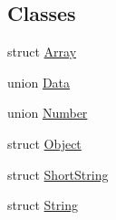 \subsection*{Classes}
\begin{DoxyCompactItemize}
\item 
struct \hyperlink{structGenericValue_1_1Array}{Array}
\item 
union \hyperlink{unionGenericValue_1_1Data}{Data}
\item 
union \hyperlink{unionGenericValue_1_1Number}{Number}
\item 
struct \hyperlink{structGenericValue_1_1Object}{Object}
\item 
struct \hyperlink{structGenericValue_1_1ShortString}{Short\+String}
\item 
struct \hyperlink{structGenericValue_1_1String}{String}
\end{DoxyCompactItemize}
